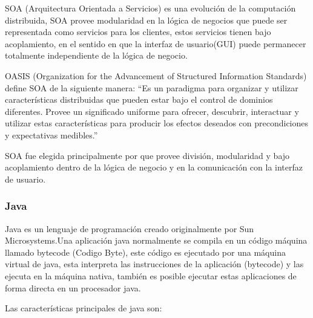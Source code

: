 SOA (Arquitectura Orientada a Servicios) es una evolución de la computación distribuida, SOA provee modularidad en la lógica de negocios que puede ser representada como servicios para los clientes, estos servicios tienen bajo acoplamiento, en el sentido en que la interfaz de usuario(GUI) puede permanecer totalmente independiente de la lógica de negocio.

OASIS (Organization for the Advancement of Structured Information Standards) define SOA de la siguiente manera: ``Es un paradigma para organizar y utilizar características distribuidas que pueden estar bajo el control de dominios diferentes. Provee un significado uniforme para ofrecer, descubrir, interactuar y utilizar estas características para producir los efectos deseados con precondiciones y expectativas medibles.''

SOA fue elegida principalmente por que provee división, modularidad y bajo acoplamiento dentro de la lógica de negocio y en la comunicación con la interfaz de usuario.


\subsubsection*{Java \cite{java} }
\label{tec:java}

Java es un lenguaje de programación creado originalmente por Sun Microsystems.\newline Una aplicación java normalmente se compila en un código máquina llamado bytecode (Codigo Byte), este código es ejecutado por una máquina virtual de java, esta interpreta las instrucciones de la aplicación (bytecode) y las ejecuta en la máquina nativa, también es posible ejecutar estas aplicaciones de forma directa en un procesador java.

Las características principales de java \cite{java_caracteristicas} son:

